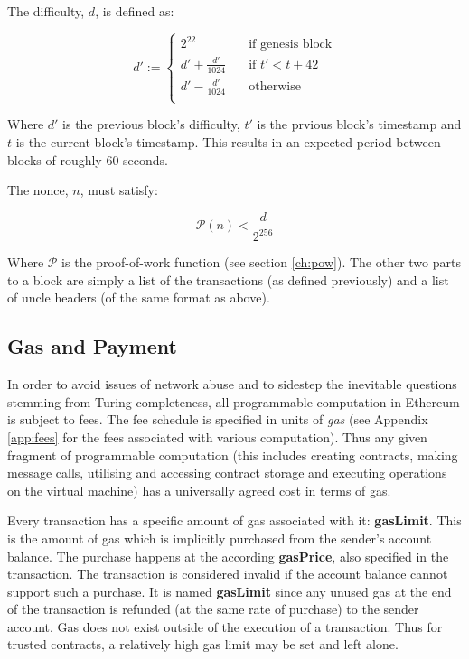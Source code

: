 \documentclass[9pt,oneside]{amsart}
\begin{document}
\begin{multicols}{2}
The difficulty, $d$, is defined as:

\begin{equation}
d' :=  \begin{cases}
2^{22} & \quad \text{if genesis block}\\
d' + \frac{d'}{1024} & \quad \text{if $t' < t + 42$}\\
d' - \frac{d'}{1024} & \quad \text{otherwise}\\
\end{cases}
\end{equation}

Where $d'$ is the previous block's difficulty, $t'$ is the prvious block's timestamp and $t$ is the current block's timestamp. This results in an expected period between blocks of roughly 60 seconds.

The nonce, $n$, must satisfy:

\begin{equation}
\mathcal{P}(n) < \frac{d}{2^{256}}
\end{equation}

Where $\mathcal{P}$ is the proof-of-work function (see section \ref{ch:pow}). The other two parts to a block are simply a list of the transactions (as defined previously) and a list of uncle headers (of the same format as above).

\subsection{Gas and Payment} \label{ch:payment}

In order to avoid issues of network abuse and to sidestep the inevitable questions stemming from Turing completeness, all programmable computation in Ethereum is subject to fees. The fee schedule is specified in units of \textit{gas} (see Appendix \ref{app:fees} for the fees associated with various computation). Thus any given fragment of programmable computation (this includes creating contracts, making message calls, utilising and accessing contract storage and executing operations on the virtual machine) has a universally agreed cost in terms of gas.

Every transaction has a specific amount of gas associated with it: \textbf{gasLimit}. This is the amount of gas which is implicitly purchased from the sender's account balance. The purchase happens at the according \textbf{gasPrice}, also specified in the transaction. The transaction is considered invalid if the account balance cannot support such a purchase. It is named \textbf{gasLimit} since any unused gas at the end of the transaction is refunded (at the same rate of purchase) to the sender account. Gas does not exist outside of the execution of a transaction. Thus for trusted contracts, a relatively high gas limit may be set and left alone.


\end{multicols}
\end{document}
